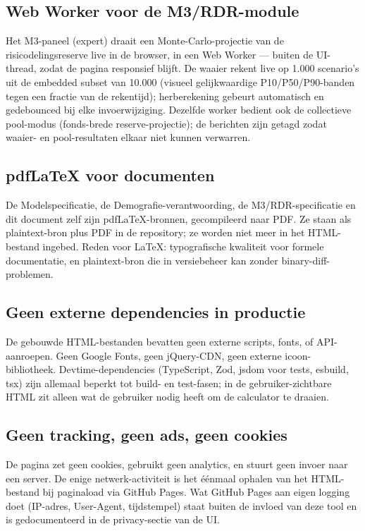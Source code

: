 \documentclass[11pt,a4paper]{article}
\begin{document}
\subsection{Web Worker voor de M3/RDR-module}

Het M3-paneel (expert) draait een Monte-Carlo-projectie van de risicodelingsreserve live in de browser, in een Web Worker --- buiten de UI-thread, zodat de pagina responsief blijft. De waaier rekent live op 1.000 scenario's uit de embedded subset van 10.000 (visueel gelijkwaardige P10/P50/P90-banden tegen een fractie van de rekentijd); herberekening gebeurt automatisch en gedebounced bij elke invoerwijziging. Dezelfde worker bedient ook de collectieve pool-modus (fonds-brede reserve-projectie); de berichten zijn getagd zodat waaier- en pool-resultaten elkaar niet kunnen verwarren.

\subsection{pdfLaTeX voor documenten}

De Modelspecificatie, de Demografie-verantwoording, de M3/RDR-specificatie en dit document zelf zijn pdfLaTeX-bronnen, gecompileerd naar PDF. Ze staan als plaintext-bron plus PDF in de repository; ze worden niet meer in het HTML-bestand ingebed. Reden voor LaTeX: typografische kwaliteit voor formele documentatie, en plaintext-bron die in versiebeheer kan zonder binary-diff-problemen.

\subsection{Geen externe dependencies in productie}

De gebouwde HTML-bestanden bevatten geen externe scripts, fonts, of API-aanroepen. Geen Google Fonts, geen jQuery-CDN, geen externe icoon-bibliotheek. Devtime-dependencies (TypeScript, Zod, jsdom voor tests, esbuild, tsx) zijn allemaal beperkt tot build- en test-fasen; in de gebruiker-zichtbare HTML zit alleen wat de gebruiker nodig heeft om de calculator te draaien.

\subsection{Geen tracking, geen ads, geen cookies}

De pagina zet geen cookies, gebruikt geen analytics, en stuurt geen invoer naar een server. De enige netwerk-activiteit is het \'e\'enmaal ophalen van het HTML-bestand bij paginaload via GitHub Pages. Wat GitHub Pages aan eigen logging doet (IP-adres, User-Agent, tijdstempel) staat buiten de invloed van deze tool en is gedocumenteerd in de privacy-sectie van de UI.
\end{document}
